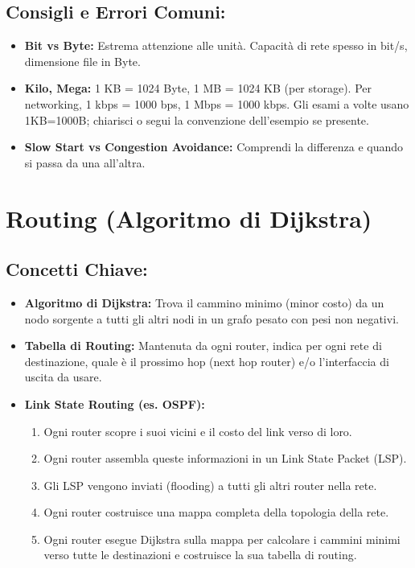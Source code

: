\subsection{Consigli e Errori Comuni:}
\begin{itemize}
    \item \textbf{Bit vs Byte:} Estrema attenzione alle unità. Capacità di rete spesso in bit/s, dimensione file in Byte.
    \item \textbf{Kilo, Mega:} 1 KB = 1024 Byte, 1 MB = 1024 KB (per storage). Per networking, 1 kbps = 1000 bps, 1 Mbps = 1000 kbps. Gli esami a volte usano 1KB=1000B; chiarisci o segui la convenzione dell'esempio se presente.
    \item \textbf{Slow Start vs Congestion Avoidance:} Comprendi la differenza e quando si passa da una all'altra.
\end{itemize}

\clearpage %

\section{Routing (Algoritmo di Dijkstra)}

\subsection{Concetti Chiave:}
\begin{itemize}
    \item \textbf{Algoritmo di Dijkstra:} Trova il cammino minimo (minor costo) da un nodo sorgente a tutti gli altri nodi in un grafo pesato con pesi non negativi.
    \item \textbf{Tabella di Routing:} Mantenuta da ogni router, indica per ogni rete di destinazione, quale è il prossimo hop (next hop router) e/o l'interfaccia di uscita da usare.
    \item \textbf{Link State Routing (es. OSPF):}
    \begin{enumerate}
        \item Ogni router scopre i suoi vicini e il costo del link verso di loro.
        \item Ogni router assembla queste informazioni in un Link State Packet (LSP).
        \item Gli LSP vengono inviati (flooding) a tutti gli altri router nella rete.
        \item Ogni router costruisce una mappa completa della topologia della rete.
        \item Ogni router esegue Dijkstra sulla mappa per calcolare i cammini minimi verso tutte le destinazioni e costruisce la sua tabella di routing.
    \end{enumerate}
\end{itemize}

